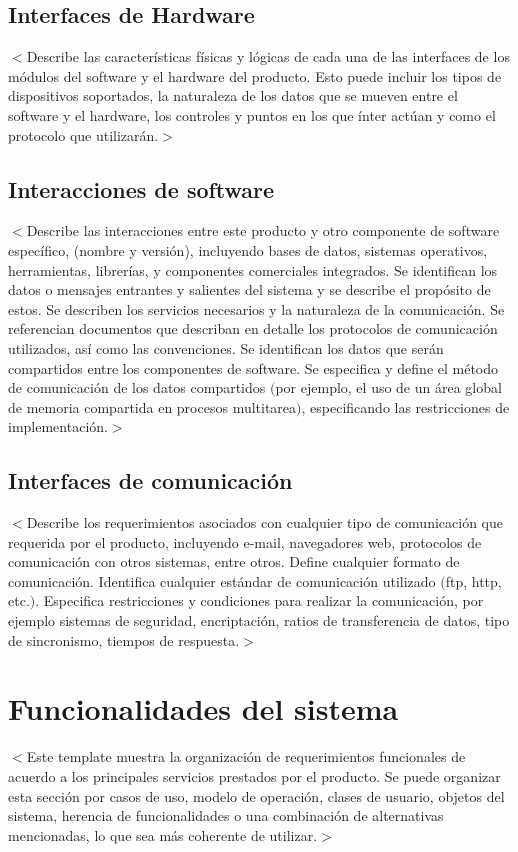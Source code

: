 \documentclass{scrreprt}
\begin{document}
\section{Interfaces de Hardware}
$<$Describe las características físicas y lógicas de cada una de las interfaces de los módulos del software y el hardware del producto. Esto puede incluir los tipos de dispositivos soportados, la naturaleza de los datos que se mueven entre el software y el hardware, los controles y puntos en los que ínter actúan y como el protocolo que utilizarán.$>$ 

\section{Interacciones de software}
$<$Describe las interacciones entre este producto y otro componente de software específico, (nombre y versión), incluyendo bases de datos, sistemas operativos, herramientas, librerías, y componentes comerciales integrados. Se identifican los datos o mensajes entrantes y salientes del sistema y se describe el propósito de estos. Se describen los servicios necesarios y la naturaleza de la comunicación. Se referencian documentos que describan en detalle los protocolos de comunicación utilizados, así como las convenciones. Se identifican los datos que serán compartidos entre los componentes de software. Se especifica y define el método de comunicación de los datos compartidos $($por ejemplo, el uso de un área global de memoria compartida en procesos multitarea$)$, especificando las restricciones de implementación.$>$

\section{Interfaces de comunicación}
$<$Describe los requerimientos asociados con cualquier tipo de comunicación que requerida por el producto, incluyendo e-mail, navegadores web, protocolos de comunicación con otros sistemas, entre otros. Define cualquier formato de comunicación. Identifica cualquier estándar de comunicación utilizado $($ftp, http, etc.$)$. Especifica restricciones y condiciones para realizar la comunicación, por ejemplo sistemas de seguridad, encriptación, ratios de transferencia de datos, tipo de sincronismo, tiempos de respuesta.$>$

\chapter{Funcionalidades del sistema}
$<$Este template muestra la organización de requerimientos funcionales de acuerdo a los principales servicios prestados por el producto. Se puede organizar esta sección por casos de uso, modelo de operación, clases de usuario, objetos del sistema, herencia de funcionalidades o una combinación de alternativas mencionadas, lo que sea más coherente de utilizar.$>$
\end{document}
